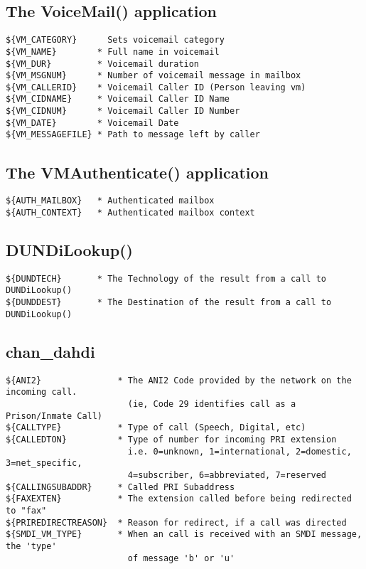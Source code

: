 \subsection{The VoiceMail() application}
\begin{verbatim}
${VM_CATEGORY}      Sets voicemail category
${VM_NAME}        * Full name in voicemail
${VM_DUR}         * Voicemail duration
${VM_MSGNUM}      * Number of voicemail message in mailbox
${VM_CALLERID}    * Voicemail Caller ID (Person leaving vm)
${VM_CIDNAME}     * Voicemail Caller ID Name
${VM_CIDNUM}      * Voicemail Caller ID Number
${VM_DATE}        * Voicemail Date
${VM_MESSAGEFILE} * Path to message left by caller
\end{verbatim}

\subsection{The VMAuthenticate() application}
\begin{verbatim}
${AUTH_MAILBOX}   * Authenticated mailbox
${AUTH_CONTEXT}   * Authenticated mailbox context
\end{verbatim}

\subsection{DUNDiLookup()}
\begin{verbatim}
${DUNDTECH}       * The Technology of the result from a call to DUNDiLookup()
${DUNDDEST}       * The Destination of the result from a call to DUNDiLookup()
\end{verbatim}

\subsection{chan\_dahdi}
\begin{verbatim}
${ANI2}               * The ANI2 Code provided by the network on the incoming call.
                        (ie, Code 29 identifies call as a Prison/Inmate Call)
${CALLTYPE}           * Type of call (Speech, Digital, etc)
${CALLEDTON}          * Type of number for incoming PRI extension
                        i.e. 0=unknown, 1=international, 2=domestic, 3=net_specific,
                        4=subscriber, 6=abbreviated, 7=reserved
${CALLINGSUBADDR}     * Called PRI Subaddress
${FAXEXTEN}           * The extension called before being redirected to "fax"
${PRIREDIRECTREASON}  * Reason for redirect, if a call was directed
${SMDI_VM_TYPE}       * When an call is received with an SMDI message, the 'type'
                        of message 'b' or 'u'
\end{verbatim}

